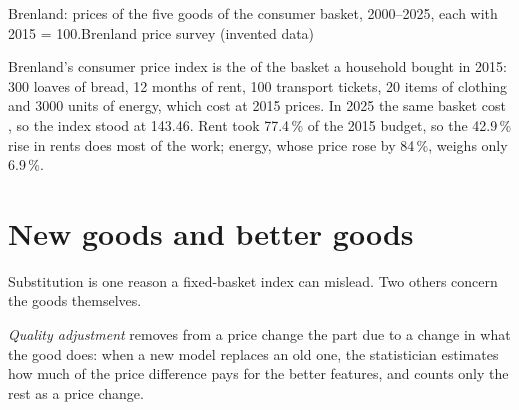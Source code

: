 \begin{omchart}{Brenland: prices of the five goods of the consumer basket, 2000--2025, each with 2015 = 100.}{Brenland price survey (invented data)}
\end{omchart}

Brenland's consumer price index is the  of the basket a household bought in 2015: 300 loaves of bread, 12 months of rent, 100 transport tickets,
20 items of clothing and 3000 units of energy, which cost  at 2015 prices. In 2025 the same basket cost , so the index stood at 143.46.
Rent took 77.4\,\% of the 2015 budget, so the 42.9\,\% rise in rents does most of the work; energy, whose price rose by 84\,\%, weighs only 6.9\,\%.

\section{New goods and better goods}\label{sec:g10:price-indices:quality}

Substitution is one reason a fixed-basket index can mislead. Two others concern the goods themselves.

\begin{definition}\label{def:g10:price-indices:quality-adjustment}
\emph{Quality adjustment} removes from a price change the part due to a change in what the good does: when a new model replaces an
old one, the statistician estimates how much of the price difference pays for the better features, and counts only the rest as a price change.
\end{definition}

